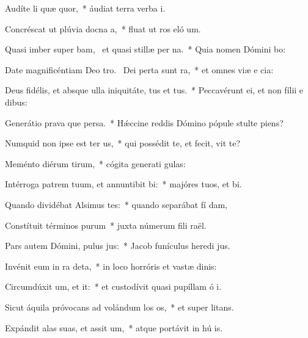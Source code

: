 \item Audíte li quæ quor,~* áudiat terra verba  i.
\item Concréscat ut plúvia docna a,~* fluat ut ros eló um.
\item Quasi imber super bam,~\pscross{} et quasi stillæ per na.~* Quia nomen Dómini bo:
\item Date magnificéntiam Deo tro.~\pscross{} Dei perta sunt ra,~* et omnes viæ e cia:
\item Deus fidélis, et absque ulla iniquitáte, tus et tus.~* Peccavérunt ei, et non fílii e  dibus:
\item Generátio prava que persa.~* Hǽccine reddis Dómino pópule stulte  piens?
\item Numquid non ipse est ter us,~* qui possédit te, et fecit,  vit te?
\item Meménto diérum tirum,~* cógita generati gulas:
\item Intérroga patrem tuum, et annuntibit bi:~* majóres tuos, et  bi.
\item Quando dividébat Alsimus tes:~* quando separábat fí dam,
\item Constítuit términos purum~* juxta númerum fili raël.
\item Pars autem Dómini, pulus jus:~* Jacob funículus heredi jus.
\item Invénit eum in ra deta,~* in loco horróris et vastæ dinis:
\item Circumdúxit um, et it:~* et custodívit quasi pupíllam ó i.
\item Sicut áquila próvocans ad volándum los os,~* et super  litans.
\item Expándit alas suas, et assit um,~* atque portávit in hú is.
